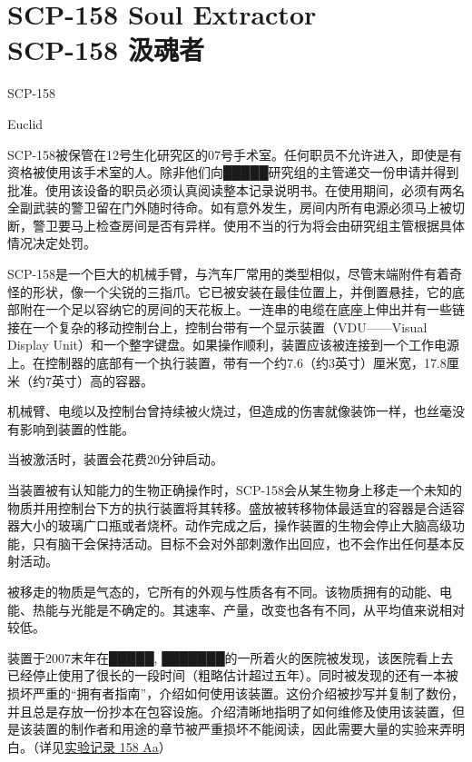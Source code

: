 \chapter[SCP-158 汲魂者]{
    SCP-158 Soul Extractor\\
    SCP-158 汲魂者
}

\label{chap:SCP-158}

SCP-158

Euclid

SCP-158被保管在12号生化研究区的07号手术室。任何职员不允许进入，即使是有资格被使用该手术室的人。除非他们向█████研究组的主管递交一份申请并得到批准。使用该设备的职员必须认真阅读整本记录说明书。在使用期间，必须有两名全副武装的警卫留在门外随时待命。如有意外发生，房间内所有电源必须马上被切断，警卫要马上检查房间是否有异样。使用不当的行为将会由研究组主管根据具体情况决定处罚。

SCP-158是一个巨大的机械手臂，与汽车厂常用的类型相似，尽管末端附件有着奇怪的形状，像一个尖锐的三指爪。它已被安装在最佳位置上，并倒置悬挂，它的底部附在一个足以容纳它的房间的天花板上。一连串的电缆在底座上伸出并有一些链接在一个复杂的移动控制台上，控制台带有一个显示装置（VDU——Visual Display Unit）和一个整字键盘。如果操作顺利，装置应该被连接到一个工作电源上。在控制器的底部有一个执行装置，带有一个约7.6（约3英寸）厘米宽，17.8厘米（约7英寸）高的容器。

机械臂、电缆以及控制台曾持续被火烧过，但造成的伤害就像装饰一样，也丝毫没有影响到装置的性能。

当被激活时，装置会花费20分钟启动。

当装置被有认知能力的生物正确操作时，SCP-158会从某生物身上移走一个未知的物质并用控制台下方的执行装置将其转移。盛放被转移物体最适宜的容器是合适容器大小的玻璃广口瓶或者烧杯。动作完成之后，操作装置的生物会停止大脑高级功能，只有脑干会保持活动。目标不会对外部刺激作出回应，也不会作出任何基本反射活动。

被移走的物质是气态的，它所有的外观与性质各有不同。该物质拥有的动能、电能、热能与光能是不确定的。其速率、产量，改变也各有不同，从平均值来说相对较低。

装置于2007末年在█████, ███████的一所着火的医院被发现，该医院看上去已经停止使用了很长的一段时间（粗略估计超过五年）。同时被发现的还有一本被损坏严重的“拥有者指南”，介绍如何使用该装置。这份介绍被抄写并复制了数份，并且总是存放一份抄本在包容设施。介绍清晰地指明了如何维修及使用该装置，但是该装置的制作者和用途的章节被严重损坏不能阅读，因此需要大量的实验来弄明白。（详见\hyperref[sec:DOC-experiment-log-158-aa]{实验记录 158 Aa}）

